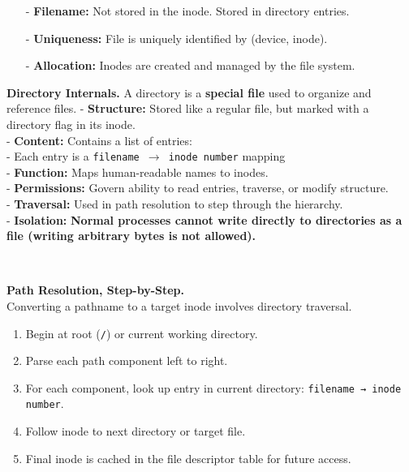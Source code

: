 \documentclass[8pt]{extarticle}
\begin{document}
\begin{minipage}[htp]{0.5\textwidth}
\begin{minipage}[t]{0.49\textwidth}
\begin{itemize}[noitemsep,nolistsep,topsep=-8px,partopsep=0pt,parsep=0pt]
            \item[-] \textbf{Filename:} Not stored in the inode. Stored in directory entries.
            \item[-] \textbf{Uniqueness:} File is uniquely identified by (device, inode).
            \item[-] \textbf{Allocation:} Inodes are created and managed by the file system.
        \end{itemize}
    \end{minipage}
    \hfill
    \begin{minipage}[t]{0.49\textwidth}
        \noindent\textbf{Directory Internals.} A directory is a \textbf{special file} used to organize and reference files.
            - \textbf{Structure:} Stored like a regular file, but marked with a directory flag in its inode. \\
            - \textbf{Content:} Contains a list of entries:\\ 
            - Each entry is a \texttt{filename $\rightarrow$ inode number} mapping\\
            - \textbf{Function:} Maps human-readable names to inodes.\\
            - \textbf{Permissions:} Govern ability to read entries, traverse, or modify structure.\\
            - \textbf{Traversal:} Used in path resolution to step through the hierarchy.\\
            - \textbf{Isolation:} \textbf{Normal processes cannot write directly to directories as a file (writing arbitrary bytes is not allowed).}
    \end{minipage}\\
    \begin{minipage}[t]{0.49\textwidth}
    \noindent\textbf{Path Resolution, Step-by-Step.} \\
    Converting a pathname to a target inode involves directory traversal.
    \begin{enumerate}[noitemsep,nolistsep,topsep=-10px,partopsep=0pt,parsep=0pt]
        \item Begin at root (\texttt{/}) or current working directory.
        \item Parse each path component left to right.
        \item For each component, look up entry in current directory: \texttt{filename → inode number}.
        \item Follow inode to next directory or target file.
        \item Final inode is cached in the file descriptor table for future access.

\end{enumerate}
\end{minipage}
\end{minipage}
\end{document}

